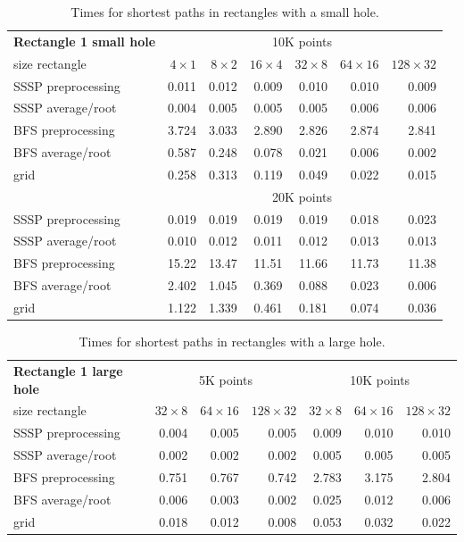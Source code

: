 \documentclass[a4paper,11pt]{article}
\begin{document}
\begin{table}[ht]
\begin{tabular}{l*{6}{r}}
\textbf{Rectangle 1 small hole}& \multicolumn{6}{c}{10K points}\\						
size rectangle	&	$4\times 1$	&	$8\times 2$	&	$16\times 4$	&	$32\times 8$	&	$64\times 16$	&	$128\times 32$	\\
\hline
SSSP preprocessing	&	0.011	&	0.012	&	0.009	&	0.010	&	0.010	&	0.009	\\
SSSP average/root	&	0.004	&	0.005	&	0.005	&	0.005	&	0.006	&	0.006	\\
BFS preprocessing	&	3.724	&	3.033	&	2.890	&	2.826	&	2.874	&	2.841	\\
BFS average/root	&	0.587	&	0.248	&	0.078	&	0.021	&	0.006	&	0.002	\\
grid				&	0.258	&	0.313	&	0.119	&	0.049	&	0.022	&	0.015	\vspace{.2cm}	\\
\hline
  & \multicolumn{6}{c}{20K points}\\						
\hline
SSSP preprocessing	&	0.019	&	0.019	&	0.019	&	0.019	&	0.018	&	0.023	\\
SSSP average/root	&	0.010	&	0.012	&	0.011	&	0.012	&	0.013	&	0.013	\\
BFS preprocessing	&	15.22	&	13.47	&	11.51	&	11.66	&	11.73	&	11.38	\\
BFS average/root	&	2.402	&	1.045	&	0.369	&	0.088	&	0.023	&	0.006	\\
grid				&	1.122	&	1.339	&	0.461	&	0.181	&	0.074	&	0.036
\end{tabular}
\caption{Times for shortest paths in rectangles with a small hole.}
\label{table2}
\end{table}

\begin{table}[ht]
\begin{tabular}{l*{3}{r}|*{3}{r}}
\textbf{Rectangle 1 large hole} & \multicolumn{3}{c|}{5K points} & \multicolumn{3}{c}{10K points}\\
size rectangle	&	$32\times 8$	&	$64\times 16$	&	$128\times 32$	&	$32\times 8$	&	$64\times 16$	&	$128\times 32$\\						
\hline
SSSP preprocessing	&	0.004	&	0.005	&	0.005	&	0.009	&	0.010	&	0.010	\\
SSSP average/root	&	0.002	&	0.002	&	0.002	&	0.005	&	0.005	&	0.005	\\
BFS preprocessing	&	0.751	&	0.767	&	0.742	&	2.783	&	3.175	&	2.804	\\
BFS average/root	&	0.006	&	0.003	&	0.002	&	0.025	&	0.012	&	0.006	\\
grid				&	0.018	&	0.012	&	0.008	&	0.053	&	0.032	&	0.022
\end{tabular}
\caption{Times for shortest paths in rectangles with a large hole.}
\label{table3}
\end{table}
\end{document}

